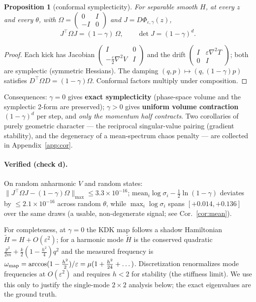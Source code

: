 \documentclass[11pt]{article}
\theoremstyle{plain}
\newtheorem{proposition}{Proposition}
\theoremstyle{definition}
\newcommand{\Om}{\Omega}
\newcommand{\half}{\tfrac12}
\begin{document}
\begin{proposition}[conformal symplecticity]\label{prop:conf}
For separable smooth $H$, at every $z$ and every $\theta$, with $\Om=\left(\begin{smallmatrix}0&I\\-I&0\end{smallmatrix}\right)$ and $J=D\Phi_{\varepsilon,\gamma}(z)$,
\[ J^\top\Om J=(1-\gamma)\,\Om,\qquad \det J=(1-\gamma)^d. \]
\end{proposition}
\begin{proof}
Each kick has Jacobian $\left(\begin{smallmatrix}I&0\\-\frac{\varepsilon}{2}\nabla^2V&I\end{smallmatrix}\right)$ and the drift $\left(\begin{smallmatrix}I&\varepsilon\nabla^2T\\0&I\end{smallmatrix}\right)$; both are symplectic (symmetric Hessians). The damping $(q,p)\mapsto(q,(1-\gamma)p)$ satisfies $D^\top\Om D=(1-\gamma)\Om$. Conformal factors multiply under composition.
\end{proof}
Consequences: $\gamma=0$ gives \textbf{exact symplecticity} (phase-space volume and the symplectic 2-form are preserved); $\gamma>0$ gives \textbf{uniform volume contraction} $(1-\gamma)^d$ per step, and \emph{only the momentum half contracts}. Two corollaries of purely geometric character --- the reciprocal singular-value pairing (gradient stability), and the degeneracy of a mean-spectrum chaos penalty --- are collected in Appendix~\ref{app:cor}.

\paragraph{Verified (check d).} On random anharmonic $V$ and random states: $\lVert J^\top\Om J-(1-\gamma)\Om\rVert_{\max}\le3.3\times10^{-16}$; $\mathrm{mean}_i\log\sigma_i-\half\ln(1-\gamma)$ deviates by $\le2.1\times10^{-16}$ across random $\theta$, while $\max_i\log\sigma_i$ spans $[+0.014,+0.136]$ over the same draws (a usable, non-degenerate signal; see Cor.~\ref{cor:mean}).

For completeness, at $\gamma=0$ the KDK map follows a shadow Hamiltonian $\tilde H=H+O(\varepsilon^2)$; for a harmonic mode $\tilde H$ is the conserved quadratic $\tfrac{p^2}{2m}+\tfrac k2(1-\tfrac{h^2}{4})q^2$ and the measured frequency is $\omega_{\rm map}=\arccos(1-\tfrac{h^2}{2})/\varepsilon=\mu(1+\tfrac{h^2}{24}+\dots)$. Discretization renormalizes mode frequencies at $O(\varepsilon^2)$ and requires $h<2$ for stability (the stiffness limit). We use this only to justify the single-mode $2\times2$ analysis below; the exact eigenvalues are the ground truth.
\end{document}
